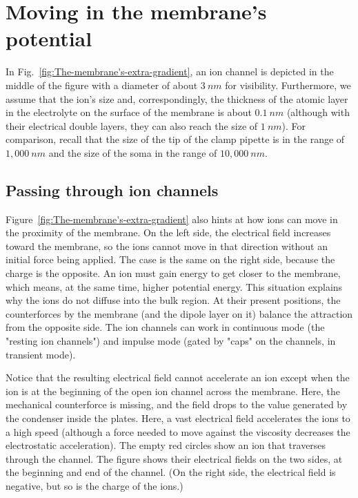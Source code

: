 \section{Moving in the membrane's potential\label{sec:Physics-MovingPotential}}


In Fig.~\ref{fig:The-membrane's-extra-gradient},
an ion channel is
depicted in the middle of the figure with a diameter of about $3\ nm$ for visibility.
Furthermore, we assume that the ion's size and, correspondingly, the
thickness of the atomic layer in the electrolyte on the surface of
the membrane is about $0.1\ nm$ (although with their electrical double layers, they can also reach the size of $1\ nm$). For comparison, recall that the
size of the tip of the clamp pipette is in the range of $1,000\ nm$
and the size of the soma in the range of $10,000\ nm$. 


\subsection{Passing through ion channels\label{sec:Physics-PassingIonChannels}}
Figure~\ref{fig:The-membrane's-extra-gradient} also hints at how ions can move in the proximity of the membrane. On the left side, the electrical field increases toward the membrane, so the ions cannot move in that direction without an initial force being applied. The case is the same on the right side, because the charge is the opposite.
An ion must gain energy to get closer to the membrane, which means, at the same time, higher potential energy.
This situation explains why the ions do not diffuse into the bulk region.
At their present positions, the counterforces by the membrane (and the dipole layer on it)
balance the attraction from the opposite side.  The ion channels
can work in continuous mode (the "resting ion channels") and
impulse mode (gated by "caps" on the channels, in transient mode).

Notice that the resulting electrical field cannot accelerate an ion 
except when the ion is at the beginning of the open ion channel across the membrane. Here, the mechanical counterforce is missing, and the field drops to the value generated by the 
condenser inside the plates. Here, a vast electrical field accelerates the ions to a high speed (although a force needed to move against the viscosity decreases the electrostatic acceleration). The empty red circles show
an ion that traverses through the channel.
The figure shows their electrical fields on the two sides, at the beginning and end of the channel. (On the right side, the electrical field is negative, but so is the charge of the ions.)


